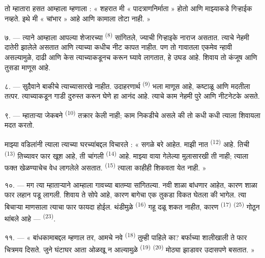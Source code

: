 तो म्हातारा हसत आम्हाला म्हणाला : « शहरात मी « पादत्राणनिर्माता » होतो आणि माझ्याकडे गिऱ्हाईक
नव्हते. इथे मी « चांभार » आहे आणि कामाला तोटा नाही. »

७. --- त्याने आम्हाला आपल्या शेजारच्या  \textsuperscript{(8)} सांगितले,
ज्याची गिऱ्हाइके नाराज असतात. त्याचे  नेहमी दातेरी झालेले असतात आणि त्याच्या
 कधीच नीट कापत नाहीत. पण तो गावातला एकमेव न्हावी असल्यामुळे, दाढी आणि केस
त्याच्याकडूनच करून घ्यावे लागतात, हे उघड आहे. शिवाय तो कंजूष आणि तुसडा माणूस आहे.

८. --- सुदैवाने बाकीचे  त्याच्यासारखे नाहीत. उदाहरणार्थ 
\textsuperscript{(9)} भला माणूस आहे, कष्टाळू आणि मदतीला तत्पर. त्याच्याकडून गाडी दुरुस्त करून
घेणे हा आनंद आहे. त्याचे काम नेहमी पुरे आणि नीटनेटके असते.

९. --- म्हाताऱ्या जेकबने  \textsuperscript{(10)} तक्रार केली
नाही; काम निकडीचे असले की तो कधी कधी त्याला  शिवायला मदत करतो.

माझ्या वडिलांनी त्याला त्याच्या घरच्यांबद्दल विचारले : « सगळे बरे आहेत. माझी नात
 \textsuperscript{(12)} आहे. तिची  \textsuperscript{(13)}
तिच्यावर फार खूश आहे, ती चांगली  \textsuperscript{(14)} आहे. माझ्या वाया
गेलेल्या मुलासारखी ती नाही; त्याला फक्त खेळण्याचेच वेध लागलेले असतात. 
\textsuperscript{(15)} त्याला काहीही शिकवता येत नाही. »

\VUsaut{3.0mm}
\VUsaut{3.0mm}

१०. --- मग त्या म्हाताऱ्याने आम्हाला गावच्या बातम्या सांगितल्या. नवी शाळा बांधणार आहेत, कारण
 शाळा फार लहान पडू लागली. शिवाय ते सोपे आहे, कारण
 बागेचा एक तुकडा विकत घेतला की भागेल. त्या बिचाऱ्या माणसाला त्याचा फार
फायदा होईल. थंडीमुळे  \textsuperscript{(16)}  गहू दळू शकत
नाहीत, कारण  \textsuperscript{(17)}  \textsuperscript{(25)} गोठून
थांबले आहे —  \textsuperscript{(23)}.

११. --- « बांधकामाबद्दल म्हणाल तर, आमचे नवे  \textsuperscript{(18)} तुम्ही पाहिले
का? बर्फाच्या शालीखाली ते फार चित्रमय दिसते. जुने घंटाघर आता ओळखू न आल्यामुळे 
\textsuperscript{(19)}  \textsuperscript{(20)} मोठ्या झाडावर उदासपणे
बसतात. »

